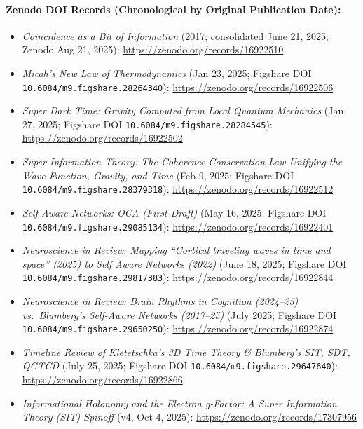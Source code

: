 \paragraph{Zenodo DOI Records (Chronological by Original Publication Date):}
\begin{itemize}
  \item \emph{Coincidence as a Bit of Information} (2017; consolidated June 21, 2025; Zenodo Aug 21, 2025): \url{https://zenodo.org/records/16922510}
  \item \emph{Micah's New Law of Thermodynamics} (Jan 23, 2025; Figshare DOI \texttt{10.\allowbreak{}6084/m9.\allowbreak{}figshare.\allowbreak{}28264340}): \url{https://zenodo.org/records/16922506}
  \item \emph{Super Dark Time: Gravity Computed from Local Quantum Mechanics} (Jan 27, 2025; Figshare DOI \texttt{10.\allowbreak{}6084/m9.\allowbreak{}figshare.\allowbreak{}28284545}): \url{https://zenodo.org/records/16922502}
  \item \emph{Super Information Theory: The Coherence Conservation Law Unifying the Wave Function, Gravity, and Time} (Feb 9, 2025; Figshare DOI \texttt{10.\allowbreak{}6084/m9.\allowbreak{}figshare.\allowbreak{}28379318}): \url{https://zenodo.org/records/16922512}
  \item \emph{Self Aware Networks: OCA (First Draft)} (May 16, 2025; Figshare DOI \texttt{10.\allowbreak{}6084/m9.\allowbreak{}figshare.\allowbreak{}29085134}): \url{https://zenodo.org/records/16922401}
  \item \emph{Neuroscience in Review: Mapping ``Cortical traveling waves in time and space'' (2025) to Self Aware Networks (2022)} (June 18, 2025; Figshare DOI \texttt{10.\allowbreak{}6084/m9.\allowbreak{}figshare.\allowbreak{}29817383}): \url{https://zenodo.org/records/16922844}
  \item \emph{Neuroscience in Review: Brain Rhythms in Cognition (2024--25) vs.\ Blumberg's Self-Aware Networks (2017--25)} (July 2025; Figshare DOI \texttt{10.\allowbreak{}6084/m9.\allowbreak{}figshare.\allowbreak{}29650250}): \url{https://zenodo.org/records/16922874}
  \item \emph{Timeline Review of Kletetschka's 3D Time Theory \& Blumberg's SIT, SDT, QGTCD} (July 25, 2025; Figshare DOI \texttt{10.\allowbreak{}6084/m9.\allowbreak{}figshare.\allowbreak{}29647640}): \url{https://zenodo.org/records/16922866}
  \item \emph{Informational Holonomy and the Electron g-Factor: A Super Information Theory (SIT) Spinoff} (v4, Oct 4, 2025): \url{https://zenodo.org/records/17307956}

\end{itemize}
